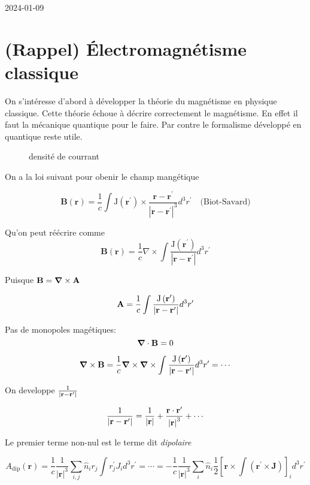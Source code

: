 


2024-01-09

\section{(Rappel) Électromagnétisme classique}

On s'intéresse d'abord à développer la théorie du magnétisme en physique classique. Cette théorie échoue à décrire correctement le magnétisme. En effet il faut la mécanique quantique pour le faire. Par contre le formalisme développé en quantique reste utile.

\begin{figure}[ht]
    \centering
    \caption{densité de courrant}
    \label{fig:densité-de-courrant}
\end{figure}

On a la loi suivant pour obenir le champ mangétique

\[ \mathbf{B}(\mathbf{r})=\frac{1}{c} \int \mathrm{J}\left(\mathbf{r}^{\prime}\right) \times \frac{\mathbf{r}-\mathbf{r}^{\prime}}{\left|\mathbf{r}-\mathbf{r}^{\prime}\right|^3} d^3 r^{\prime} \quad \text{(Biot-Savard)}  \] 

Qu'on peut réécrire comme 
\[ \mathbf{B}(\mathbf{r})=\frac{1}{c} \nabla \times \int \frac{\mathrm{J}\left(\mathbf{r}^{\prime}\right)}{\left|\mathbf{r}-\mathbf{r}^{\prime}\right|} d^3 r^{\prime} \]

Puisque $\vb{B} = \grad \times \vb{A}$

\[ \vb{A} = \frac{1}{c} \int \frac{\mathrm{J}\left(\mathbf{r}^{\prime}\right)}{\left|\mathbf{r}-\mathbf{r}^{\prime}\right|} d^3 r^{\prime} \]

Pas de monopoles magétiques:
\[ \grad \cdot \vb{B} = 0 \]

\[ \grad \times \vb{B} = \frac{1}{c} \grad \times \grad \times \int \frac{\mathrm{J}\left(\mathbf{r}^{\prime}\right)}{\left|\mathbf{r}-\mathbf{r}^{\prime}\right|} d^3 r^{\prime} = \dotsb \]

On developpe $\frac{1}{\abs{\vb{r}-\vb{r}'} } $

\[ \frac{1}{\abs{\vb{r}-\vb{r}'} } = \frac{1}{\abs{\vb{r}}} + \frac{\vb{r}\cdot \vb{r}'}{\abs{\vb{r}}^{3}}   + \dotsb\]

Le premier terme non-nul est le terme dit \textit{dipolaire}

\[ A_{\text{dip}}(\mathbf{r})=\frac{1}{c} \frac{1}{|\mathbf{r}|^3} \sum_{i, j} \hat{n}_i r_j \int r_j^{\prime} J_i d^3 r^{\prime} = \dotsb = -\frac{1}{c} \frac{1}{|\mathbf{r}|^3} \sum_i \hat{n}_i \frac{1}{2}\left[\mathbf{r} \times \int\left(\mathbf{r}^{\prime} \times \mathbf{J}\right)\right]_i d^3 r^{\prime}\]

